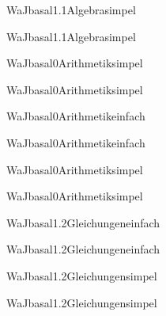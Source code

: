 \documentclass[12pt]{article}
\begin{document}
\begin{Add}{WaJ}{basal1.1}{Algebra}{simpel}
\solution{ }
\end{Add}
\begin{Add}{WaJ}{basal1.1}{Algebra}{simpel}
\end{Add}

\begin{Add}{WaJ}{basal0}{Arithmetik}{simpel}
\solution{ }
\end{Add}
\begin{Add}{WaJ}{basal0}{Arithmetik}{simpel}
\end{Add}

\begin{Add}{WaJ}{basal0}{Arithmetik}{einfach}
\solution{ }
\end{Add}
\begin{Add}{WaJ}{basal0}{Arithmetik}{einfach}
\end{Add}

\begin{Add}{WaJ}{basal0}{Arithmetik}{simpel}
\solution{ }
\end{Add}
\begin{Add}{WaJ}{basal0}{Arithmetik}{simpel}
\end{Add}

\begin{Add}{WaJ}{basal1.2}{Gleichungen}{einfach}
\solution{ }
\end{Add}
\begin{Add}{WaJ}{basal1.2}{Gleichungen}{einfach}
\end{Add}

\begin{Add}{WaJ}{basal1.2}{Gleichungen}{simpel}
\solution{ }
\end{Add}
\begin{Add}{WaJ}{basal1.2}{Gleichungen}{simpel}
\end{Add}
\end{document}
